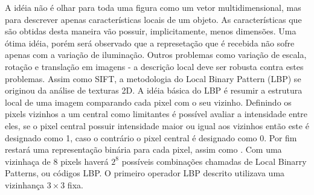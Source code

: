 A idéia não é olhar para toda uma figura como um vetor multidimensional, mas para descrever apenas características locais de um objeto. As características que são obtidas desta maneira vão possuir, implicitamente, menos dimensões. Uma ótima idéia,  porém será observado que a represetação que é recebida não sofre apenas com a variação de iluminação. Outros problemas como variação de escala, rotação e translação em imagens - a descrição local deve ser robusta contra estes problemas. Assim como {\ttfamily SIFT}, a metodologia do Local Binary Pattern (LBP) se originou da análise de texturas 2D. A idéia básica do LBP é resumir a estrutura local de uma imagem comparando cada pixel com o seu vizinho. Definindo os pixels vizinhos a um central como limitantes é possível avaliar a intensidade entre eles, se o pixel central possuir intensidade maior ou igual aos vizinhos então este é designado como 1, caso o contrário o pixel central é designado como 0. Por fim restará uma representação binária para cada pixel, assim como {}. Com uma vizinhaça de 8 pixels haverá $2^8$ possíveis combinações chamadas de Local Binarry Patterns, ou códigos LBP. O primeiro operador LBP descrito utilizava uma vizinhança $3 \times 3$ fixa.





